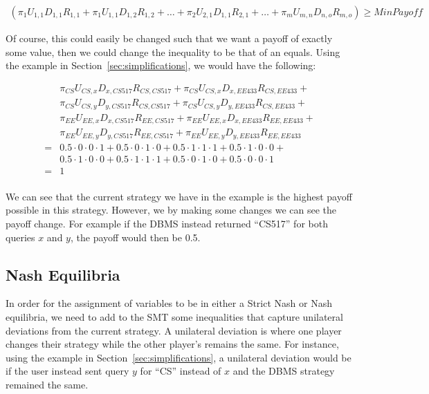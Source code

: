 \documentclass{article}
\begin{document}
\begin{align}
\label{eqn:payoffreduction}
(\pi_1U_{1,1}D_{1,1}R_{1,1} + \pi_1U_{1,1}D_{1,2}R_{1,2} + \ldots + \pi_2U_{2,1}D_{1,1}R_{2,1} + \ldots + \pi_mU_{m,n}D_{n,o}R_{m,o}) \ge MinPayoff
\end{align}

Of course, this could easily be changed such that we want a payoff of exactly some value, then we could change the inequality to be that of an equals. Using the example in Section~\ref{sec:simplifications}, we would have the following:

\begin{align}
\label{eqn:payoffreduction:example}
&\pi_{CS}U_{CS,x}D_{x,CS517}R_{CS,CS517} + \pi_{CS}U_{CS,x}D_{x,EE433}R_{CS,EE433} +\\\nonumber
&\pi_{CS}U_{CS,y}D_{y,CS517}R_{CS,CS517} + \pi_{CS}U_{CS,y}D_{y,EE433}R_{CS,EE433}+\\\nonumber
&\pi_{EE}U_{EE,x}D_{x,CS517}R_{EE,CS517} + \pi_{EE}U_{EE,x}D_{x,EE433}R_{EE,EE433} +\\\nonumber
&\pi_{EE}U_{EE,y}D_{y,CS517}R_{EE,CS517} + \pi_{EE}U_{EE,y}D_{y,EE433}R_{EE,EE433}\\\nonumber
=&0.5\cdot0\cdot0\cdot1 + 0.5\cdot0\cdot1\cdot0 + 0.5\cdot1\cdot1\cdot1 + 0.5\cdot1\cdot0\cdot0+\\\nonumber
&0.5\cdot1\cdot0\cdot0 + 0.5 \cdot1\cdot1\cdot1 + 0.5\cdot0\cdot1\cdot0 + 0.5\cdot0\cdot0\cdot1\\\nonumber
=&1\\\nonumber
\end{align}

We can see that the current strategy we have in the example is the highest payoff possible in this strategy. However, we by making some changes we can see the payoff change. For example if the DBMS instead returned ``CS517'' for both queries $x$ and $y$, the payoff would then be 0.5. 

\subsection{Nash Equilibria}
\label{sec:nashequil}
In order for the assignment of variables to be in either a Strict Nash or Nash equilibria, we need to add to the SMT some inequalities that capture unilateral deviations from the current strategy. A unilateral deviation is where one player changes their strategy while the other player's remains the same. For instance, using the example in Section~\ref{sec:simplifications}, a unilateral deviation would be if the user instead sent query $y$ for ``CS'' instead of $x$ and the DBMS strategy remained the same. 
\end{document}
